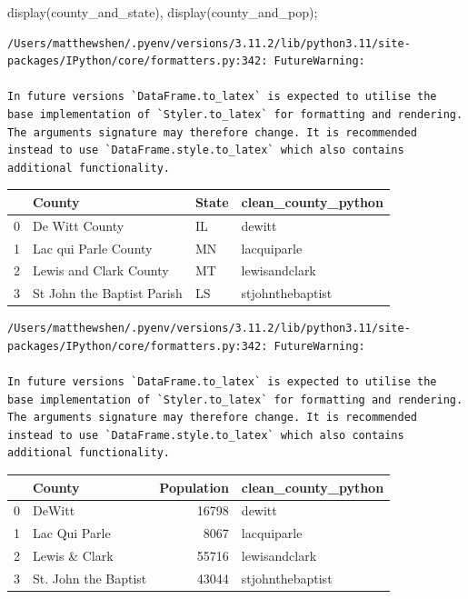 \documentclass[
  letterpaper,
  DIV=11,
  numbers=noendperiod]{scrreprt}
\newenvironment{Shaded}{\begin{snugshade}}{\end{snugshade}}
\newcommand{\NormalTok}[1]{\textcolor[rgb]{0.00,0.23,0.31}{#1}}
\newcommand{\OperatorTok}[1]{\textcolor[rgb]{0.37,0.37,0.37}{#1}}
\begin{document}
\begin{Shaded}
\begin{Highlighting}[]
\NormalTok{display(county\_and\_state), display(county\_and\_pop)}\OperatorTok{;}
\end{Highlighting}
\end{Shaded}

\begin{verbatim}
/Users/matthewshen/.pyenv/versions/3.11.2/lib/python3.11/site-packages/IPython/core/formatters.py:342: FutureWarning:

In future versions `DataFrame.to_latex` is expected to utilise the base implementation of `Styler.to_latex` for formatting and rendering. The arguments signature may therefore change. It is recommended instead to use `DataFrame.style.to_latex` which also contains additional functionality.
\end{verbatim}

\begin{tabular}{llll}
\toprule
{} &                      County & State & clean\_county\_python \\
\midrule
0 &              De Witt County &    IL &              dewitt \\
1 &        Lac qui Parle County &    MN &         lacquiparle \\
2 &      Lewis and Clark County &    MT &       lewisandclark \\
3 &  St John the Baptist Parish &    LS &    stjohnthebaptist \\
\bottomrule
\end{tabular}

\begin{verbatim}
/Users/matthewshen/.pyenv/versions/3.11.2/lib/python3.11/site-packages/IPython/core/formatters.py:342: FutureWarning:

In future versions `DataFrame.to_latex` is expected to utilise the base implementation of `Styler.to_latex` for formatting and rendering. The arguments signature may therefore change. It is recommended instead to use `DataFrame.style.to_latex` which also contains additional functionality.
\end{verbatim}

\begin{tabular}{llrl}
\toprule
{} &                County &  Population & clean\_county\_python \\
\midrule
0 &                DeWitt &       16798 &              dewitt \\
1 &         Lac Qui Parle &        8067 &         lacquiparle \\
2 &         Lewis \& Clark &       55716 &       lewisandclark \\
3 &  St. John the Baptist &       43044 &    stjohnthebaptist \\
\bottomrule
\end{tabular}
\end{document}
